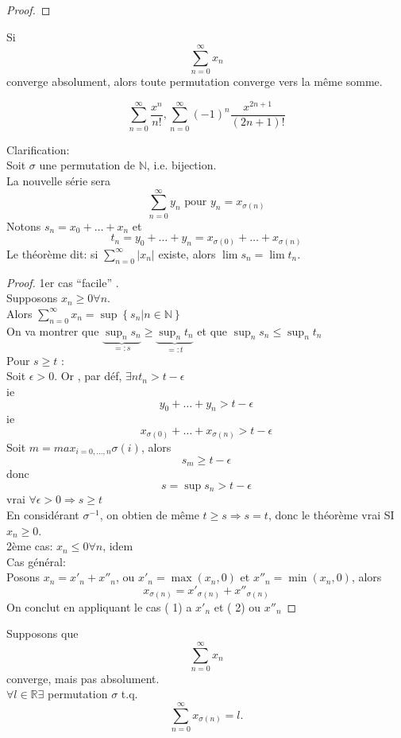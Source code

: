 \documentclass[../main.tex]{subfiles}
\begin{document}
\begin{exemple}
\begin{proof}
\end{proof}
\begin{thm}
Si 
\[ 
\sum_{n=0}^{ \infty} x_n 
\]
converge absolument, alors toute permutation converge vers la même somme.
\end{thm}
\begin{exemple}
\[ 
	\sum_{n=0}^{ \infty} \frac{x^{n}}{n!}, \sum_{n=0}^{ \infty} (-1)^{n} \frac{x^{2n+1}}{(2n+1)!}
\]
\end{exemple}
Clarification:\\
Soit $\sigma$ une permutation de $\mathbb{N}$, i.e. bijection.\\
La nouvelle série sera
\[ 
	\sum_{n=0}^{ \infty} y_n \text{ pour } y_n = x_{\sigma(n)} 
\]
Notons $s_n = x_0 + \ldots + x_n$ et 
\[ 
	t_n = y_0 + \ldots + y_n = x_{\sigma(0)} + \ldots + x_{\sigma(n)} 
\]
Le théorème dit: si $ \sum_{n=0}^{ \infty} |x_n|$ existe, alors $\lim s_n = \lim t_n$.
\begin{proof}
1er cas ``facile'' .\\
Supposons $x_n \geq 0 \forall n$.\\
Alors $ \sum_{n=0}^{ \infty} x_n = \sup \left\{ s_n | n \in \mathbb{N} \right\} $\\
On va montrer que $ \underbrace{\sup_n s_n}_{=:s} \geq \underbrace{\sup_n t_n}_{=:t}$ et que $ \sup_n s_n \leq \sup_n t_n$\\
Pour $s \geq t$ : \\
Soit $\epsilon > 0$. Or , par déf, $\exists n t_n > t - \epsilon$\\
ie
\[ 
y_0 + \ldots + y_n > t- \epsilon
\]
ie
\[ 
	x_{\sigma(0)} + \ldots + x_{\sigma(n)} > t - \epsilon
\]
Soit $m = max_{i=0,\ldots, n} \sigma(i)$, alors
\[ 
s_m \geq t - \epsilon
\]
donc 
\[ 
s = \sup s_n > t - \epsilon
\]
vrai $\forall \epsilon> 0 \Rightarrow  s \geq t$\\
En considérant $\sigma ^{-1}$, on obtien de même $t \geq s \Rightarrow s =t$, donc
le théorème vrai SI $x_n \geq 0$.\\
2ème cas: $x_n \leq 0 \forall n$, idem\\
Cas général:\\
Posons $x_n = x'_n + x''_n$, ou
$x'_n = \max(x_n,0)$ et $x''_n = \min(x_n,0)$, alors
 \[ 
	 x_{\sigma(n)}  = x'_{\sigma(n)}  + x''_{\sigma(n)}
\]
On conclut en appliquant le cas ( 1) a  $x'_n$ et ( 2) ou $x''_n$
\end{proof}
\begin{thm}
Supposons que 
\[ 
\sum_{n=0}^{ \infty} x_n
\]
converge, mais pas absolument.\\
$\forall l \in \mathbb{R} \exists $ permutation $\sigma$ t.q.
\[ 
	\sum_{n=0}^{ \infty} x_{\sigma(n)}  = l.
\]

\end{thm}


\end{exemple}
\end{document}
